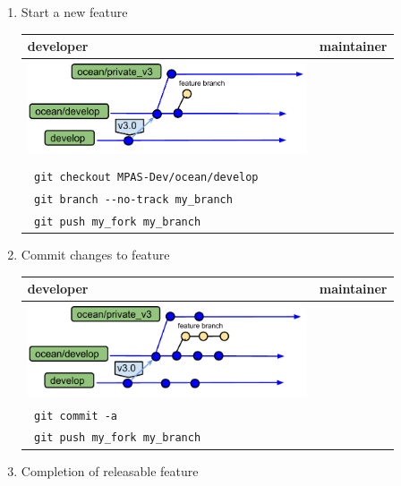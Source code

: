 \documentclass[11pt]{article}
\begin{document}
\begin{enumerate}
\item Start a new feature

 \begin{tabular}[c]{L{3.25in}|L{3.25in}}
developer & maintainer \\
\hline
\includegraphics[width=3.25in]{f/MPASworkflow_1.pdf} \\
\\
\verb| git checkout MPAS-Dev/ocean/develop | \\
\verb| git branch --no-track my_branch|  \\
\verb| git push my_fork my_branch|  & 
 \end{tabular}
\item Commit changes to feature 

 \begin{tabular}[c]{L{3.25in}|L{3.25in}}
developer & maintainer \\
\hline
\includegraphics[width=3.25in]{f/MPASworkflow_2.pdf} \\
\verb| git commit -a|  \\
\verb| git push my_fork my_branch|  
 \end{tabular}

\clearpage
\item Completion of releasable feature


\end{enumerate}
\end{document}
